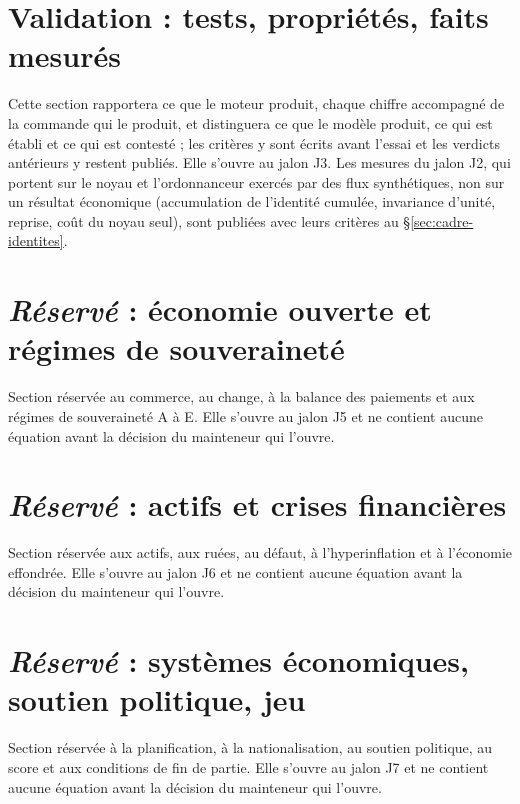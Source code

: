 \documentclass[11pt,a4paper]{article}
\begin{document}
\section{Validation : tests, propriétés, faits mesurés}
\label{sec:validation}
Cette section rapportera ce que le moteur produit, chaque chiffre accompagné de la commande qui le produit, et distinguera ce que le modèle produit, ce qui est établi et ce qui est contesté ; les critères y sont écrits avant l'essai et les verdicts antérieurs y restent publiés. Elle s'ouvre au jalon J3. Les mesures du jalon J2, qui portent sur le noyau et l'ordonnanceur exercés par des flux synthétiques, non sur un résultat économique (accumulation de l'identité cumulée, invariance d'unité, reprise, coût du noyau seul), sont publiées avec leurs critères au \S\ref{sec:cadre-identites}.

\section[Réservé : économie ouverte et régimes de souveraineté]{\emph{Réservé} : économie ouverte et régimes de souveraineté}
\label{sec:ouverture}
Section réservée au commerce, au change, à la balance des paiements et aux régimes de souveraineté A à E. Elle s'ouvre au jalon J5 et ne contient aucune équation avant la décision du mainteneur qui l'ouvre.

\section[Réservé : actifs et crises financières]{\emph{Réservé} : actifs et crises financières}
\label{sec:crises}
Section réservée aux actifs, aux ruées, au défaut, à l'hyperinflation et à l'économie effondrée. Elle s'ouvre au jalon J6 et ne contient aucune équation avant la décision du mainteneur qui l'ouvre.

\section[Réservé : systèmes économiques, soutien politique, jeu]{\emph{Réservé} : systèmes économiques, soutien politique, jeu}
\label{sec:jeu}
Section réservée à la planification, à la nationalisation, au soutien politique, au score et aux conditions de fin de partie. Elle s'ouvre au jalon J7 et ne contient aucune équation avant la décision du mainteneur qui l'ouvre.
\end{document}

